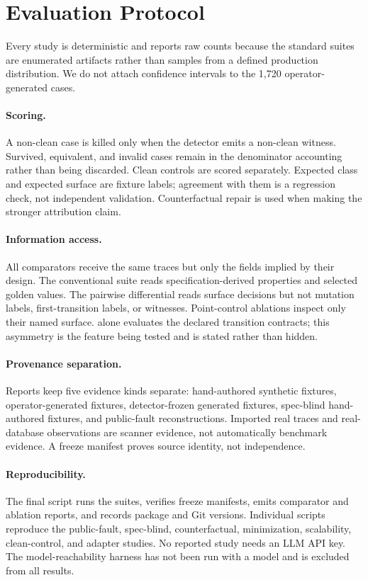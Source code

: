 \section{Evaluation Protocol}

Every study is deterministic and reports raw counts because the standard suites are enumerated artifacts rather than samples from a defined production distribution. We do not attach confidence intervals to the 1,720 operator-generated cases.

\paragraph{Scoring.}
A non-clean case is killed only when the detector emits a non-clean witness. Survived, equivalent, and invalid cases remain in the denominator accounting rather than being discarded. Clean controls are scored separately. Expected class and expected surface are fixture labels; agreement with them is a regression check, not independent validation. Counterfactual repair is used when making the stronger attribution claim.

\paragraph{Information access.}
All comparators receive the same traces but only the fields implied by their design. The conventional suite reads specification-derived properties and selected golden values. The pairwise differential reads surface decisions but not mutation labels, first-transition labels, or witnesses. Point-control ablations inspect only their named surface. \policystrata{} alone evaluates the declared transition contracts; this asymmetry is the feature being tested and is stated rather than hidden.

\paragraph{Provenance separation.}
Reports keep five evidence kinds separate: hand-authored synthetic fixtures, operator-generated fixtures, detector-frozen generated fixtures, spec-blind hand-authored fixtures, and public-fault reconstructions. Imported real traces and real-database observations are scanner evidence, not automatically benchmark evidence. A freeze manifest proves source identity, not independence.

\paragraph{Reproducibility.}
The final script runs the suites, verifies freeze manifests, emits comparator and ablation reports, and records package and Git versions. Individual scripts reproduce the public-fault, spec-blind, counterfactual, minimization, scalability, clean-control, and adapter studies. No reported study needs an LLM API key. The model-reachability harness has not been run with a model and is excluded from all results.

